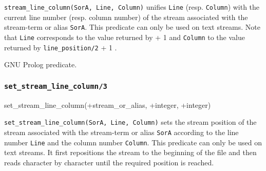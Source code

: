 \texttt{stream\_line\_column(SorA, Line, Column)} unifies \texttt{Line}
(resp. \texttt{Column}) with the current line number (resp. column number)
of the stream associated with the stream-term or alias \texttt{SorA}. This
predicate can only be used on text streams. Note that \texttt{Line}
corresponds to the value returned by  + 1
 and \texttt{Column} to the value returned
by \texttt{line\_position/2} + 1 .

\begin{PlErrors}







\end{PlErrors}

\Portability

GNU Prolog predicate.

\subsubsection{\texttt{set\_stream\_line\_column/3}}

\begin{TemplatesOneCol}
set\_stream\_line\_column(+stream\_or\_alias, +integer, +integer)

\end{TemplatesOneCol}

\Description

\texttt{set\_stream\_line\_column(SorA, Line, Column)} sets the stream
position of the stream associated with the stream-term or alias \texttt{SorA}
according to the line number \texttt{Line} and the column number
\texttt{Column}. This predicate can only be used on text streams. It first
repositions the stream to the beginning of the file and then reads character
by character until the required position is reached.

